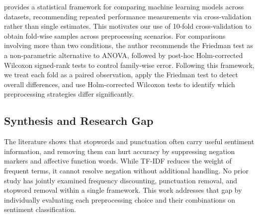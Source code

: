 \documentclass[a4paper,10pt]{article}
\begin{document}
\citet{demsarstats} provides a statistical framework for comparing machine learning models across datasets, recommending repeated performance measurements via cross-validation rather than single estimates. This motivates our use of 10-fold cross-validation to obtain fold-wise samples across preprocessing scenarios. For comparisons involving more than two conditions, the author recommends the Friedman test as a non-parametric alternative to ANOVA, followed by post-hoc Holm-corrected Wilcoxon signed-rank tests to control family-wise error. Following this framework, we treat each fold as a paired observation, apply the Friedman test to detect overall differences, and use Holm-corrected Wilcoxon tests to identify which preprocessing strategies differ significantly.

\subsection{Synthesis and Research Gap}
The literature shows that stopwords and punctuation often carry useful sentiment information, and removing them can hurt accuracy by suppressing negation markers and affective function words. While TF-IDF reduces the weight of frequent terms, it cannot resolve negation without additional handling. No prior study has jointly examined frequency discounting, punctuation removal, and stopword removal within a single framework. This work addresses that gap by individually evaluating each preprocessing choice and their combinations on sentiment classification.
\end{document}
